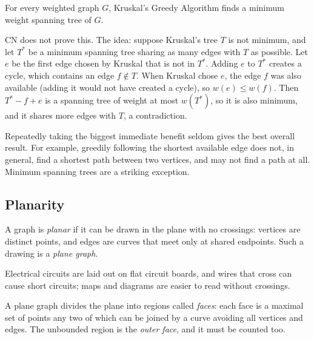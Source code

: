 \begin{theorem}[CN Thm 70]
For every weighted graph $G$, Kruskal's Greedy Algorithm finds a minimum weight spanning tree of $G$.
\end{theorem}

\begin{note}
CN does not prove this. The idea: suppose Kruskal's tree $T$ is not minimum, and let $T^*$ be a minimum spanning tree sharing as many edges with $T$ as possible. Let $e$ be the first edge chosen by Kruskal that is not in $T^*$. Adding $e$ to $T^*$ creates a cycle, which contains an edge $f\notin T$. When Kruskal chose $e$, the edge $f$ was also available (adding it would not have created a cycle), so $w(e)\le w(f)$. Then $T^*-f+e$ is a spanning tree of weight at most $w(T^*)$, so it is also minimum, and it shares more edges with $T$, a contradiction.
\end{note}

\begin{note}
Repeatedly taking the biggest immediate benefit seldom gives the best overall result. For example, greedily following the shortest available edge does not, in general, find a shortest path between two vertices, and may not find a path at all. Minimum spanning trees are a striking exception.
\end{note}

\subsection{Planarity}
\label{sec:12-5}

\begin{definition}
A graph is \emph{planar} if it can be drawn in the plane with no crossings: vertices are distinct points, and edges are curves that meet only at shared endpoints. Such a drawing is a \emph{plane graph}.
\end{definition}

\begin{note}
Electrical circuits are laid out on flat circuit boards, and wires that cross can cause short circuits; maps and diagrams are easier to read without crossings.
\end{note}

\begin{definition}[Face]
A plane graph divides the plane into regions called \emph{faces}: each face is a maximal set of points any two of which can be joined by a curve avoiding all vertices and edges. The unbounded region is the \emph{outer face}, and it must be counted too.
\end{definition}

